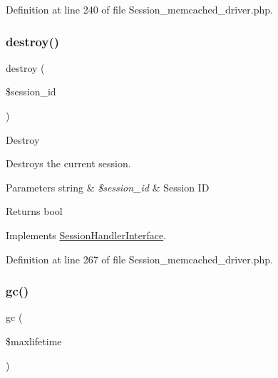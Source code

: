 Definition at line 240 of file Session\+\_\+memcached\+\_\+driver.\+php.

\mbox{\label{class_c_i___session__memcached__driver_aaec5812f6b4eb6835f88d3baa06a002a}} 
\subsubsection{\texorpdfstring{destroy()}{destroy()}}
{\footnotesize\ttfamily destroy (\begin{DoxyParamCaption}\item[{}]{\$session\+\_\+id }\end{DoxyParamCaption})}

Destroy

Destroys the current session.


\begin{DoxyParams}[1]{Parameters}
string & {\em \$session\+\_\+id} & Session ID \\
\hline
\end{DoxyParams}
\begin{DoxyReturn}{Returns}
bool 
\end{DoxyReturn}


Implements \mbox{\hyperlink{interface_session_handler_interface_aaec5812f6b4eb6835f88d3baa06a002a}{Session\+Handler\+Interface}}.



Definition at line 267 of file Session\+\_\+memcached\+\_\+driver.\+php.

\mbox{\label{class_c_i___session__memcached__driver_a57aff7ee0656d8aa75d545fb8b3ae35d}} 
\subsubsection{\texorpdfstring{gc()}{gc()}}
{\footnotesize\ttfamily gc (\begin{DoxyParamCaption}\item[{}]{\$maxlifetime }\end{DoxyParamCaption})}

